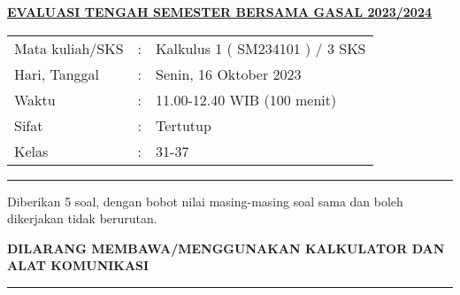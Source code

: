 \documentclass[10pt,openany,a4paper]{article}
\renewcommand{\headrulewidth}{0pt}
\begin{document}
    \newpage
    \fancyhead{}
    \fancyhead[r]{}
    \renewcommand{\headrulewidth}{0pt}
    
    \begin{center}
	{\underline{\textbf{\MakeUppercase{Evaluasi Tengah Semester Bersama Gasal 2023/2024}}}}
    \end{center}

    \begin{center}
	\begin{tabular}{lcl}
		Mata kuliah/SKS & : & Kalkulus 1 ( SM234101 ) / 3 SKS\\
		Hari, Tanggal & : & Senin, 16 Oktober 2023\\
		Waktu & : & 11.00-12.40 WIB (100 menit)\\
		Sifat & : & Tertutup\\
		Kelas & : & 31-37
	\end{tabular}
    \end{center}
	
    \noindent\rule{\textwidth}{2.pt}
	
    \setlength{\parindent}{5pt}
    \par Diberikan 5 soal, dengan bobot nilai masing-masing soal sama dan boleh dikerjakan tidak berurutan.
    \setlength{\parindent}{5pt}
    \setlength{\parindent}{5pt}
    {\small
    \par \textbf{\MakeUppercase{Dilarang membawa/menggunakan kalkulator dan alat komunikasi}}
    }
    \par {}
	
    \noindent\rule{\textwidth}{2.pt}
	
\end{document}
